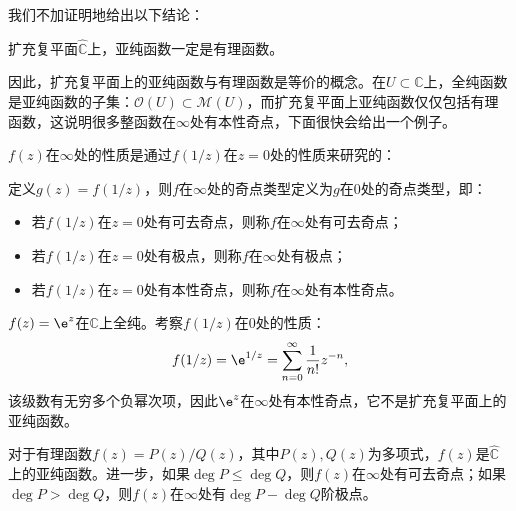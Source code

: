 我们不加证明地给出以下结论\cite{Function_Theory}：
\begin{claim}
    扩充复平面$\hat{\mathbb{C}}$上，亚纯函数一定是有理函数。
\end{claim}
因此，扩充复平面上的亚纯函数与有理函数是等价的概念。在$U\subset\mathbb{C}$上，全纯函数是亚纯函数的子集：$\mathcal{O}(U)\subset\mathcal{M}(U)$，而扩充复平面上亚纯函数仅仅包括有理函数，这说明很多整函数在$\infty$处有本性奇点，下面很快会给出一个例子。

$f(z)$在$\infty$处的性质是通过$f(1/z)$在$z=0$处的性质来研究的：
\begin{definition}[无穷远点的奇点类型]
    定义$g(z)=f(1/z)$，则$f$在$\infty$处的奇点类型定义为$g$在$0$处的奇点类型，即：
    \begin{itemize}
        \item 若$f(1/z)$在$z=0$处有可去奇点，则称$f$在$\infty$处有可去奇点；
        \item 若$f(1/z)$在$z=0$处有极点，则称$f$在$\infty$处有极点；
        \item 若$f(1/z)$在$z=0$处有本性奇点，则称$f$在$\infty$处有本性奇点。
    \end{itemize}
\end{definition}

\begin{example}
    $f(z)=\e^z$在$\mathbb{C}$上全纯。考察$f(1/z)$在$0$处的性质：
    \begin{equation}
        f(1/z)=\e^{1/z}=\sum_{n=0}^{\infty}\frac{1}{n!}z^{-n},
    \end{equation}
    该级数有无穷多个负幂次项，因此$\e^z$在$\infty$处有本性奇点，它不是扩充复平面上的亚纯函数。
\end{example}
\begin{example}
    对于有理函数$f(z)=P(z)/Q(z)$，其中$P(z),Q(z)$为多项式，$f(z)$是$\hat{\mathbb{C}}$上的亚纯函数。进一步，如果$\deg P\leq\deg Q$，则$f(z)$在$\infty$处有可去奇点；如果$\deg P>\deg Q$，则$f(z)$在$\infty$处有$\deg P-\deg Q$阶极点。
\end{example}

